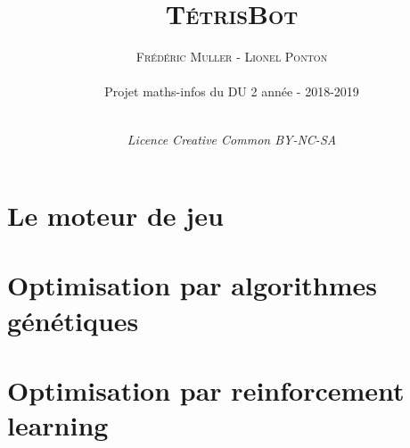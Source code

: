 


\lfoot[\thepage]{}
\rfoot[]{\thepage}


\renewcommand{\encadre}[1]{
	\begin{center}
		\fbox{\parbox{0.9\linewidth}{
				\medskip
				
				#1
				
				\medskip
		}}
	\end{center}	
}	

\usepackage{hyperref}



\title{\Huge{\textsc{TétrisBot}}}
\author{\textsc{Frédéric Muller - Lionel Ponton}\\ \ \\ \small{Projet maths-infos du DU 2 année - 2018-2019}\\ \ \\}


\date{\vfill \textit{Licence Creative Common BY-NC-SA}}
\maketitle


\clearpage{\pagestyle{empty}\cleardoublepage}



\setcounter{tocdepth}{1}
\tableofcontents
\thispagestyle{fancy}


\part{Le moteur de jeu}

%



\part{Optimisation par algorithmes génétiques}


\part{Optimisation par reinforcement learning}






